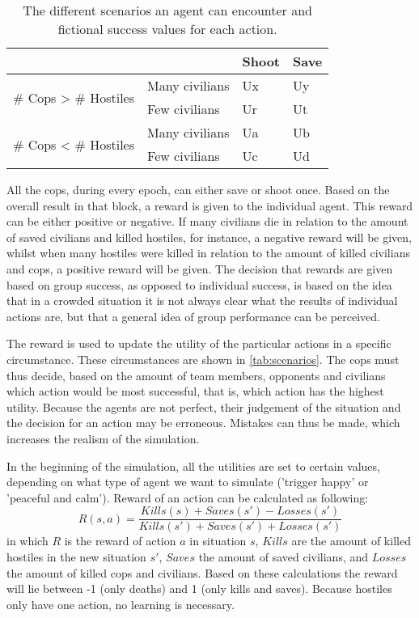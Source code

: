\begin{table}
\begin{center}
\begin{tabular}{l l | l l}
\hline
 & & Shoot & Save \\
\hline
\multirow{2}{*}{\# Cops > \# Hostiles} & Many civilians & Ux & Uy \\
 & Few civilians & Ur & Ut \\
\hline
\multirow{2}{*}{\# Cops < \# Hostiles} & Many civilians & Ua & Ub\\
 & Few civilians & Uc & Ud\\
\hline
\end{tabular}
\caption{The different scenarios an agent can encounter and fictional success values for each action.}
\label{tab:scenarios}
\end{center}
\end{table}
All the cops, during every epoch, can either save or shoot once. Based on the overall result in that block, a reward is given to the individual agent. This reward can be either positive or negative. If many civilians die in relation to the amount of saved civilians and killed hostiles, for instance, a negative reward will be given, whilst when many hostiles were killed in relation to the amount of killed civilians and cops, a positive reward will be given. The decision that rewards are given based on group success, as opposed to individual success, is based on the idea that in a crowded situation it is not always clear what the results of individual actions are, but that a general idea of group performance can be perceived. 

The reward is used to update the utility of the particular actions in a specific circumstance. These circumstances are shown in \autoref{tab:scenarios}. The cops must thus decide, based on the amount of team members, opponents and civilians which action would be most successful, that is, which action has the highest utility. Because the agents are not perfect, their judgement of the situation and the decision for an action may be erroneous. Mistakes can thus be made, which increases the realism of the simulation. 

In the beginning of the simulation, all the utilities are set to certain values, depending on what type of agent we want to simulate ('trigger happy' or 'peaceful and calm'). Reward of an action can be calculated as following: 
$$ R(s,a) = \frac{Kills(s) + Saves(s') - Losses(s')}{Kills(s') + Saves(s') + Losses(s')}$$
in which $R$ is the reward of action $a$ in situation $s$, $Kills$ are the amount of killed hostiles in the new situation $s'$, $Saves$ the amount of saved civilians, and $Losses$ the amount of killed cops and civilians. Based on these calculations the reward will lie between -1 (only deaths) and 1 (only kills and saves). Because hostiles only have one action, no learning is necessary. 

